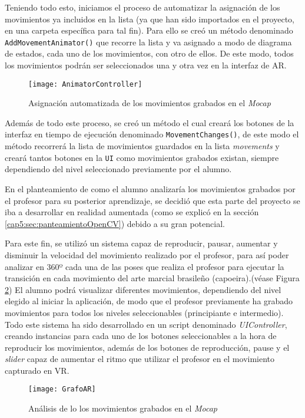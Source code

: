 Teniendo todo esto, iniciamos el proceso de automatizar la asignación de los movimientos ya incluidos en la lista (ya que han sido importados en el proyecto, en una carpeta específica para tal fin). Para ello se creó un método denominado \texttt{AddMovementAnimator()} que recorre la lista y va asignado a modo de diagrama de estados, cada uno de los movimientos, con otro de ellos. De este modo, todos los movimientos podrán ser seleccionados una y otra vez en la interfaz de AR. 

\begin{figure}[h!]
    \centering 
    \texttt{[image: AnimatorController]}
    \caption{Asignación automatizada de los movimientos grabados en el \textit{Mocap}}
    \label{fig:AnimatorController}
\end{figure} 

Además de todo este proceso, se creó un método el cual creará los botones de la interfaz en tiempo de ejecución denominado \texttt{MovementChanges()}, de este modo el método recorrerá la lista de movimientos guardados en la lista \textit{movements} y creará tantos botones en la \texttt{UI} como movimientos grabados existan, siempre dependiendo del nivel seleccionado previamente por el alumno.

En el planteamiento de como el alumno analizaría los movimientos grabados por el profesor para su posterior aprendizaje, se decidió que esta parte del proyecto se iba a desarrollar en realidad aumentada (como se explicó en la sección \ref{cap5:sec:panteamientoOpenCV}) debido a su gran potencial. 

Para este fin, se utilizó un sistema capaz de reproducir, pausar, aumentar y disminuir la velocidad del movimiento realizado por el profesor, para así poder analizar en 360º cada una de las poses que realiza el profesor para ejecutar la transición en cada movimiento del arte marcial brasileño (capoeira).(véase Figura \ref{fig:GrafoAR}) El alumno podrá visualizar diferentes movimientos, dependiendo del nivel elegido al iniciar la aplicación, de modo que el profesor previamente ha grabado movimientos para todos los niveles seleccionables (principiante e intermedio). Todo este sistema ha sido desarrollado en un script denominado \textit{UIController}, creando instancias para cada uno de los botones seleccionables a la hora de reproducir los movimientos, además de los botones de reproducción, pause y el \textit{slider} capaz de aumentar el ritmo que utilizar el profesor en el movimiento capturado en VR.

\begin{figure}[h!]
    \centering 
    \texttt{[image: GrafoAR]}
    \caption{Análisis de lo los movimientos grabados en el \textit{Mocap}}
    \label{fig:GrafoAR}
\end{figure} 

